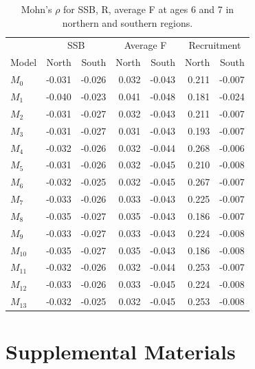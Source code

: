 \documentclass[
]{article}
\begin{document}
\begin{table}

\caption{\label{tab:rho-table}Mohn's $\rho$ for SSB, R, average F at ages 6 and 7 in northern and southern regions.}
\centering
\begin{tabular}[t]{lrrrrrr}
\toprule
\multicolumn{1}{c}{ } & \multicolumn{2}{c}{SSB} & \multicolumn{2}{c}{Average F} & \multicolumn{2}{c}{Recruitment} \\
\cmidrule(l{3pt}r{3pt}){2-3} \cmidrule(l{3pt}r{3pt}){4-5} \cmidrule(l{3pt}r{3pt}){6-7}
Model & North & South & North & South & North & South\\
\midrule
$M_{0}$ & -0.031 & -0.026 & 0.032 & -0.043 & 0.211 & -0.007\\
$M_{1}$ & -0.040 & -0.023 & 0.041 & -0.048 & 0.181 & -0.024\\
$M_{2}$ & -0.031 & -0.027 & 0.032 & -0.043 & 0.211 & -0.007\\
$M_{3}$ & -0.031 & -0.027 & 0.031 & -0.043 & 0.193 & -0.007\\
$M_{4}$ & -0.032 & -0.026 & 0.032 & -0.044 & 0.268 & -0.006\\
\addlinespace
$M_{5}$ & -0.031 & -0.026 & 0.032 & -0.045 & 0.210 & -0.008\\
$M_{6}$ & -0.032 & -0.025 & 0.032 & -0.045 & 0.267 & -0.007\\
$M_{7}$ & -0.033 & -0.026 & 0.033 & -0.043 & 0.225 & -0.007\\
$M_{8}$ & -0.035 & -0.027 & 0.035 & -0.043 & 0.186 & -0.007\\
$M_{9}$ & -0.033 & -0.027 & 0.033 & -0.043 & 0.224 & -0.008\\
\addlinespace
$M_{10}$ & -0.035 & -0.027 & 0.035 & -0.043 & 0.186 & -0.008\\
$M_{11}$ & -0.032 & -0.026 & 0.032 & -0.044 & 0.253 & -0.007\\
$M_{12}$ & -0.033 & -0.026 & 0.033 & -0.045 & 0.224 & -0.008\\
$M_{13}$ & -0.032 & -0.025 & 0.032 & -0.045 & 0.253 & -0.008\\
\bottomrule
\end{tabular}
\end{table}
\clearpage

\hypertarget{supplemental-materials}{%
\section*{Supplemental Materials}\label{supplemental-materials}}
\end{document}
